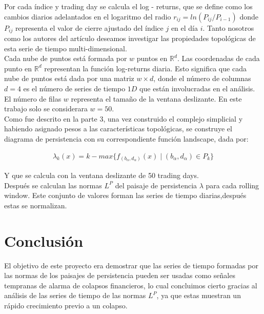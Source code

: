 \documentclass{article}
\begin{document}
Por cada índice y trading day se calcula el log - returns, que se define como los cambios diarios adelantados en el logaritmo del radio $ r_{ij} = ln (P_{ij}/P_{i - 1}) $ donde $ P_{ij} $ representa el valor de cierre ajustado del índice $ j $ en el día $ i $. Tanto nosotros como los autores del artículo deseamos investigar las propiedades topológicas de esta serie de tiempo multi-dimensional.\\

Cada nube de puntos está formada por $ w $ puntos en $ \mathbb{R}^d $. Las coordenadas de cada punto en $ \mathbb{R}^d $ representan la función log-returns diaria. Esto significa que cada nube de puntos está dada por una matriz $ w \times d $, donde el número de columnas $ d = 4 $ es el número de series de tiempo $ 1D $ que están involucradas en el análisis. El número de filas $ w $ representa el tamaño de la ventana deslizante. En este trabajo solo se considerara $ w = 50 $.\\

Como fue descrito en la parte 3, una vez construido el complejo simplicial y habiendo asignado pesos a las características topológicas, se construye el diagrama de persistencia con su correspondiente función landscape, dada por: 

\begin{align}
    \lambda_{k} (x) = k - max \{f_{(b_{\alpha} , d_{\alpha} ) } (x) \mid (b_{\alpha} , d_{\alpha}) \in P_{k}\}
\end{align}

Y que se calcula con la ventana deslizante de 50 trading days.\\

Después se calculan las normas $ L^P $ del paisaje de persistencia $ \lambda $ para cada rolling window. Este conjunto de valores forman las series de tiempo diarias,después estas se normalizan.\\

\maketitle

\section{Conclusión}

El objetivo de este proyecto era demostrar que las series de tiempo formadas por las normas de los paisajes de persistencia pueden ser usadas como señales tempranas de alarma de colapsos financieros, lo cual concluimos cierto gracias al análisis de las series de tiempo de las normas $ L^P $, ya que estas muestran un rápido crecimiento previo a un colapso. \\
\end{document}
